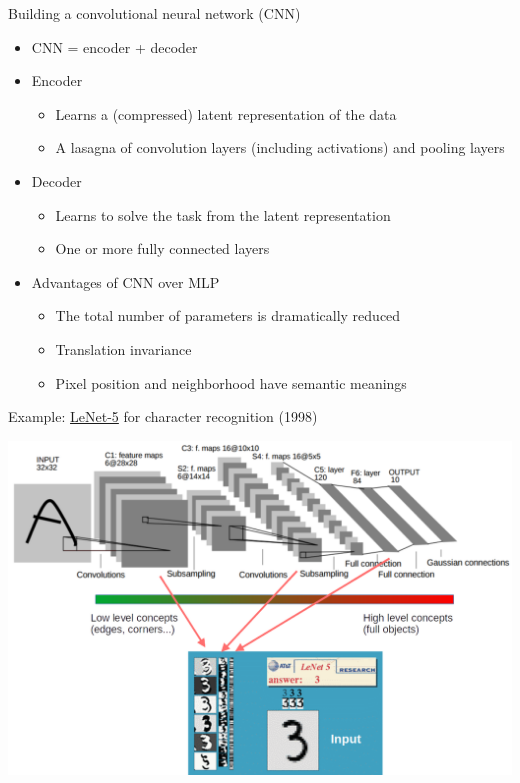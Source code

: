 \documentclass[usenames,dvipsnames]{beamer}
\begin{document}
    \begin{frame}{\secname}{\subsecname}
        Building a convolutional neural network (\alert{CNN})
        \begin{itemize}
            \item CNN = encoder + decoder
            \item Encoder
            \begin{itemize}
                \item Learns a (compressed) latent representation of the data
                \item A lasagna of convolution layers (including activations) and pooling layers
            \end{itemize}
            \item Decoder
            \begin{itemize}
                \item Learns to solve the task from the latent representation
                \item One or more fully connected layers
            \end{itemize}
            \item Advantages of CNN over MLP
            \begin{itemize}
                \item The total number of parameters is dramatically reduced
                \item Translation invariance
                \item Pixel position and neighborhood have semantic meanings
            \end{itemize}
        \end{itemize}
    \end{frame}
    \begin{frame}{\secname}{\subsecname}
        Example: \href{http://yann.lecun.com/exdb/lenet/}{LeNet-5} for character recognition (1998)
        \begin{center}
            \includegraphics[width=0.95\linewidth]{figures/DL_fundamentals/LeNet5.png}
        \end{center}
    \end{frame}
\end{document}
